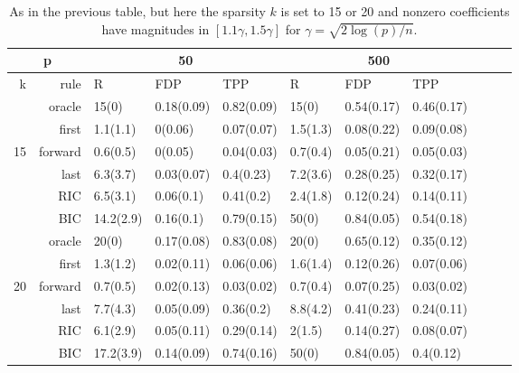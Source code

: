 
\begin{table}[ht]
\centering
\begin{tabular}{|r|r|lll|lll|lll|}
 \hline
   \multicolumn{2}{|c|}{p} & \multicolumn{3}{c|}{50}  & \multicolumn{3}{c|}{500} \\ 
  \hline \hline
    k & rule  &  R        & FDP        &  TPP          &   R      & FDP        & TPP \\ 
  \hline
   & oracle  & 15(0)     & 0.18(0.09) & 0.82(0.09)  & 15(0) & 0.54(0.17) & 0.46(0.17) \\
   & first   & 1.1(1.1)  & 0(0.06)    & 0.07(0.07)  & 1.5(1.3) & 0.08(0.22) & 0.09(0.08) \\
15 & forward & 0.6(0.5)  & 0(0.05)    & 0.04(0.03)  & 0.7(0.4) & 0.05(0.21) & 0.05(0.03) \\
   & last    & 6.3(3.7)  & 0.03(0.07) & 0.4(0.23)   & 7.2(3.6) & 0.28(0.25) & 0.32(0.17) \\
   & RIC     & 6.5(3.1)  & 0.06(0.1)  & 0.41(0.2)   & 2.4(1.8) & 0.12(0.24) & 0.14(0.11) \\
   & BIC     & 14.2(2.9) & 0.16(0.1)  & 0.79(0.15)  & 50(0) & 0.84(0.05) & 0.54(0.18) \\
  \hline
   & oracle  & 20(0)     & 0.17(0.08) & 0.83(0.08)  & 20(0) & 0.65(0.12) & 0.35(0.12) \\
   & first   & 1.3(1.2)  & 0.02(0.11) & 0.06(0.06)  & 1.6(1.4) & 0.12(0.26) & 0.07(0.06) \\
20 & forward & 0.7(0.5)  & 0.02(0.13) & 0.03(0.02)  & 0.7(0.4) & 0.07(0.25) & 0.03(0.02) \\
   & last    & 7.7(4.3)  & 0.05(0.09) & 0.36(0.2)   & 8.8(4.2) & 0.41(0.23) & 0.24(0.11) \\
   & RIC     & 6.1(2.9)  & 0.05(0.11) & 0.29(0.14)  & 2(1.5) & 0.14(0.27) & 0.08(0.07) \\ 
   & BIC     & 17.2(3.9) & 0.14(0.09) & 0.74(0.16)  & 50(0) & 0.84(0.05) & 0.4(0.12) \\ 

  \hline
\end{tabular}
\caption{As in the previous table, but here the sparsity $k$ is set to 15 or 20
  and nonzero coefficients have magnitudes in $[1.1\gamma, 1.5\gamma]$ for
  $\gamma = \sqrt{2\log(p)/n}$. }
\end{table}

